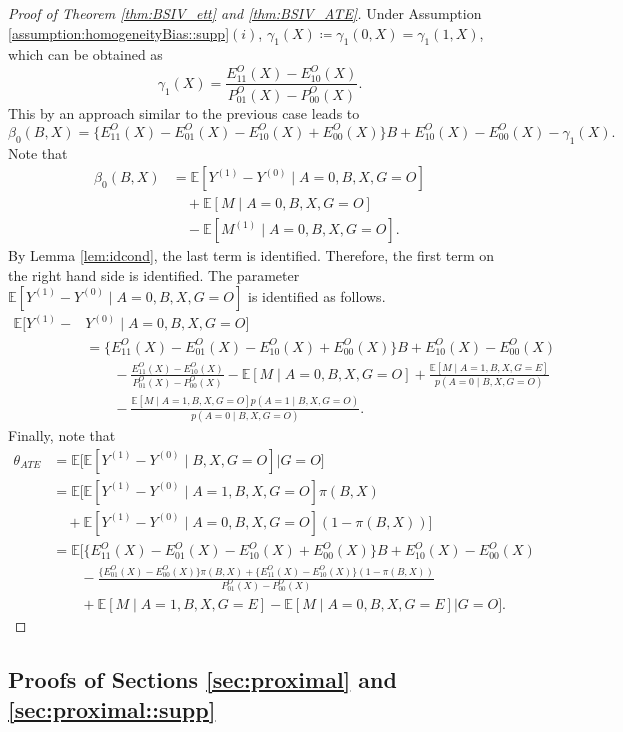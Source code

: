 \documentclass[10pt]{article}
\newcommand{\E}{\mathbb{E}}
\begin{document}
\begin{proof}[Proof of Theorem \ref{thm:BSIV_ett} and \ref{thm:BSIV_ATE}]
Under Assumption \ref{assumption:homogeneityBias::supp}$(i)$, $\gamma_1(X)\coloneqq\gamma_1(0,X)=\gamma_1(1,X)$, which can be obtained as
\[
\gamma_1(X)=\frac{E_{11}^O(X)-E_{10}^O(X)}{P_{01}^O(X)-P_{00}^O(X)}.
\]
This by an approach similar to the previous case leads to
\[
\beta_0(B,X)=\{E_{11}^O(X)-E_{01}^O(X)-E_{10}^O(X)+E_{00}^O(X)\}B+E_{10}^O(X)-E_{00}^O(X)-\gamma_1(X).
\]
Note that
\begin{align*}
\beta_0(B,X)
&=\E[Y^{(1)}-Y^{(0)}\mid A=0,B,X,G=O]\\
&\quad+\E[M\mid A=0,B,X,G=O]\\
&\quad-\E[M^{(1)}\mid A=0,B,X,G=O].
\end{align*}	
By Lemma \ref{lem:idcond}, the last term is identified. Therefore, the first term on the right hand side is identified. The parameter $\E[Y^{(1)}-Y^{(0)}\mid A=0,B,X,G=O]$ is identified as follows.
\begin{align*}
\E[Y^{(1)}-&Y^{(0)}\mid A=0,B,X,G=O]\\
&=%
\{E_{11}^O(X)-E_{01}^O(X)-E_{10}^O(X)+E_{00}^O(X)\}B+E_{10}^O(X)-E_{00}^O(X)\\
&\qquad-\frac{E_{11}^O(X)-E_{10}^O(X)}{P_{01}^O(X)-P_{00}^O(X)}-\E[M\mid A=0,B,X,G=O]+\frac{\E[M\mid A=1,B,X,G=E]}{p(A=0\mid B,X,G=O)}\\
&\qquad-\frac{\E[M\mid A=1,B,X,G=O]p(A=1\mid B,X,G=O)}{p(A=0\mid B,X,G=O)}.%
\end{align*}	
Finally, note that
\begin{align*}
\theta_{ATE}&=\E\big[\E[Y^{(1)}-Y^{(0)}\mid B,X,G=O]\big|G=O\big]\\
&=\E\big[\E[Y^{(1)}-Y^{(0)}\mid A=1,B,X,G=O]\pi(B,X)\\
&\quad+\E[Y^{(1)}-Y^{(0)}\mid A=0,B,X,G=O](1-\pi(B,X))\big]\\
&=\E\Big[
\{E_{11}^O(X)-E_{01}^O(X)-E_{10}^O(X)+E_{00}^O(X)\}B+E_{10}^O(X)-E_{00}^O(X)\\
&\qquad-\frac{\{E_{01}^O(X)-E_{00}^O(X)\}\pi(B,X)+\{E_{11}^O(X)-E_{10}^O(X)\}(1-\pi(B,X))}{P_{01}^O(X)-P_{00}^O(X)}\\
&\qquad+\E[M\mid A=1,B,X,G=E]-\E[M\mid A=0,B,X,G=E]\Big|G=O\Big].
\end{align*}	

\end{proof}


\subsection{Proofs of Sections \ref{sec:proximal} and \ref{sec:proximal::supp}}
\end{document}
